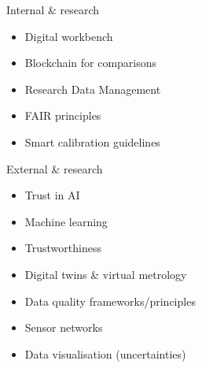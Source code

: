 \documentclass{beamer}
\begin{document}
\begin{frame}
\begin{columns}
\begin{column}{0.45\textwidth}
\begin{block}{Internal \& research}
\begin{itemize}
                        \item Digital workbench
                        \item Blockchain for comparisons
                        \item Research Data Management
                        \item FAIR principles
                        \item Smart calibration guidelines
                    \end{itemize}
                \end{block}
                \begin{block}{External \& research}
                    \scriptsize
                    \begin{itemize}
                        \item Trust in AI
                        \item Machine learning
                        \item Trustworthiness
                        \item Digital twins \& virtual metrology
                        \item Data quality frameworks/principles
                        \item Sensor networks
                        \item Data visualisation (uncertainties)
                    \end{itemize}
                \end{block}
            \end{column}
        \end{columns}
    \end{frame}
\end{document}

